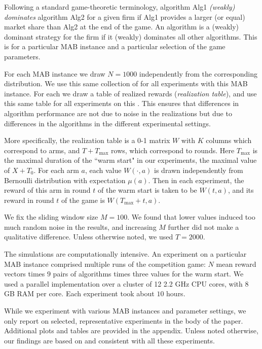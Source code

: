 \documentclass[../competing_bandits.tex]{subfiles}
\begin{document}
Following a standard game-theoretic terminology, algorithm Alg1 \emph{(weakly) dominates} algorithm Alg2 for a given firm if Alg1 provides a larger (or equal) market share than Alg2 at the end of the game. An algorithm is a (weakly) dominant strategy for the firm if it (weakly) dominates all other algorithms. This is for a particular MAB instance and a particular selection of the game parameters.



For each MAB instance we draw $N = 1000$ \MRVs independently from the corresponding distribution. We use this same collection of \MRVs for all experiments with this MAB instance. For each \MRV we draw a table of realized rewards (\emph{realization table}), and use this same table for all experiments on this \MRV. This ensures that differences in algorithm performance are not due to noise in the realizations but due to differences in the algorithms in the different experimental settings.

More specifically, the realization table is a 0-1 matrix $W$ with $K$ columns which correspond to arms, and $T+T_{\max}$ rows, which correspond to rounds. Here $T_{\max}$ is the maximal duration of the ``warm start" in our experiments, \ie the maximal value of $X+T_0$. For each arm $a$, each value $W(\cdot,a)$ is drawn independently from Bernoulli distribution with expectation $\mu(a)$. Then in each experiment, the reward of this arm in round $t$ of the warm start is taken to be $W(t,a)$, and its reward in round $t$ of the game is $W(T_{\max}+t,a)$.

We fix the sliding window size $M = 100$. We found that lower values induced too much random noise in the results, and increasing $M$ further did not make a qualitative difference. Unless otherwise noted, we used $T = 2000$.

The simulations are computationally intensive. An experiment on a particular MAB instance comprised multiple runs of the competition game: $N$ mean reward vectors times $9$ pairs of algorithms times three values for the warm start. We used a parallel implementation over a cluster of 12 2.2 GHz CPU cores, with 8 GB RAM per core. Each experiment took about $10$ hours.

While we experiment with various MAB instances and parameter settings, we only report on selected, representative experiments in the body of the paper. Additional plots and tables are provided in the appendix. Unless noted otherwise, our findings are based on and consistent with all these experiments.
\end{document}
